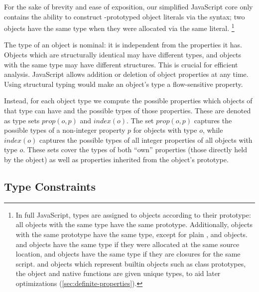 For the sake of brevity and ease of exposition, our simplified JavaScript core
only contains the ability to construct -prototyped object
literals via the \code{\{\}} syntax;
two objects have the same type when they were allocated via the same literal.
\footnote{
In full JavaScript, types are assigned to objects according to their prototype:
all objects with the same type have the same prototype.
Additionally, objects with the same prototype have the same type,
except for plain ,  and  objects.
 and  objects have the same type if they were
allocated at the same source location,
and  objects have the same type if they are closures
for the same script.
 and  objects which represent builtin objects
such as class prototypes, the  object and native functions
are given unique types, to aid later optimizations
(\Section\ref{sec:definite-properties}).}

The type of an object is nominal: it is independent from the properties it
has. Objects which are structurally identical may have different types, and
objects with the same type may have different structures. This is crucial for
efficient analysis. JavaScript allows addition or deletion of object properties
at any time. Using structural typing would make an object's type a
flow-sensitive property.

Instead, for each object type we compute the possible properties which
objects of that type can have and the possible types of those properties.
These are denoted as type sets $\mathit{prop}(o,p)$ and
$\mathit{index}(o)$. The set $\mathit{prop}(o,p)$ captures the possible types
of a non-integer property $p$ for objects with type $o$, while
$\mathit{index}(o)$ captures the possible types of all integer properties of
all objects with type $o$.
These sets cover the types of both ``own'' properties (those directly held
by the object) as well as properties inherited from the object's prototype.

\subsection{Type Constraints}
\label{sec:constraints}

